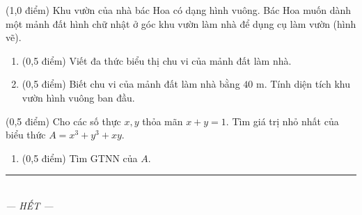 \documentclass[12pt,a4paper]{article}
\begin{document}
\begin{ex} (1,0 điểm)
Khu vườn của nhà bác Hoa có dạng hình vuông. Bác Hoa muốn dành một mảnh đất hình chữ nhật ở góc khu vườn làm nhà để dụng cụ làm vườn (hình vẽ).
\begin{center}
\end{center}
\begin{enumerate}[label=\textbf{\alph*)}, leftmargin=0.8cm, itemsep=2pt]
\item (0,5 điểm) Viết đa thức biểu thị chu vi của mảnh đất làm nhà.
\item (0,5 điểm) Biết chu vi của mảnh đất làm nhà bằng $40\text{ m}$. Tính diện tích khu vườn hình vuông ban đầu.
\end{enumerate}
\end{ex}
\vspace{0.5mm}

\begin{ex} (0,5 điểm)
Cho các số thực $x, y$ thỏa mãn $x + y = 1$. Tìm giá trị nhỏ nhất của biểu thức $A = x^3 + y^3 + xy$.
\begin{enumerate}[label=\textbf{\alph*)}, leftmargin=0.8cm, itemsep=2pt]
\item (0,5 điểm) Tìm GTNN của $A$.
\end{enumerate}
\end{ex}
\vspace{0.5mm}


\begin{center}
\rule{4cm}{0.4pt}\\
\textit{--- HẾT ---}
\end{center}
\end{document}
